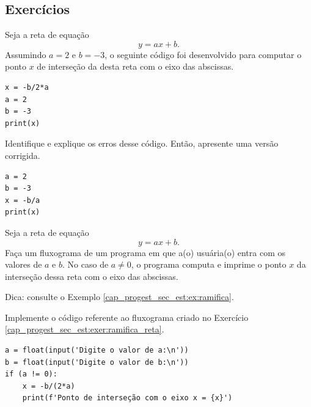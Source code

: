 \subsection{Exercícios}

\begin{exer}
  Seja a reta de equação
  \begin{equation}
    y = ax + b.
  \end{equation}
  Assumindo $a=2$ e $b=-3$, o seguinte código foi desenvolvido para computar o ponto $x$ de interseção da desta reta com o eixo das abscissas.

\begin{lstlisting}
x = -b/2*a
a = 2
b = -3
print(x)
\end{lstlisting}

Identifique e explique os erros desse código. Então, apresente uma versão corrigida.
\end{exer}
\begin{resp}

\begin{lstlisting}
a = 2
b = -3
x = -b/a
print(x)
\end{lstlisting}

\end{resp}

\begin{exer}\label{cap_progest_sec_est:exer:ramifica_reta}
  Seja a reta de equação
  \begin{equation}
    y = ax + b.
  \end{equation}
  Faça um fluxograma de um programa em que a(o) usuária(o) entra com os valores de $a$ e $b$. No caso de $a\neq 0$, o programa computa e imprime o ponto $x$ da interseção dessa reta com o eixo das abscissas.
\end{exer}
\begin{resp}
  Dica: consulte o Exemplo \ref{cap_progest_sec_est:ex:ramifica}.
\end{resp}

\begin{exer}
  Implemente o código referente ao fluxograma criado no Exercício \ref{cap_progest_sec_est:exer:ramifica_reta}.
\end{exer}
\begin{resp}

\begin{lstlisting}
a = float(input('Digite o valor de a:\n'))
b = float(input('Digite o valor de b:\n'))
if (a != 0):
    x = -b/(2*a)
    print(f'Ponto de interseção com o eixo x = {x}')
\end{lstlisting}

\end{resp}

